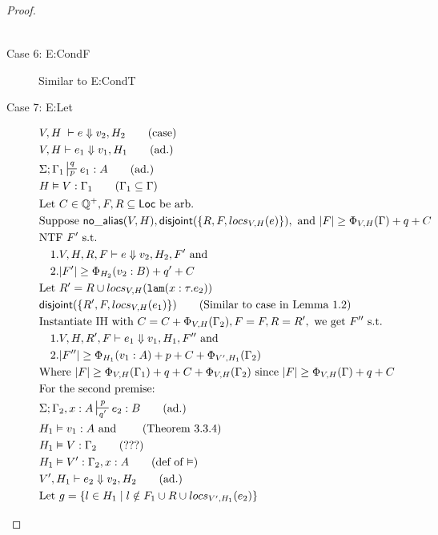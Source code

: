 \documentclass[11pt]{article}
\newcommand{\ms}[1]{\ensuremath{\mathsf{#1}}}
\newcommand{\irl}[1]{\mathtt{#1}}
\newcommand{\na}[1]{\mathsf{no\_alias}(#1)}
\newcommand{\dist}[1]{\mathsf{disjoint}(#1)}
\begin{document}
\begin{proof}
\begin{description}
\begin{align*}
  \end{align*}
  \item[Case 6: E:CondF] 
  Similar to E:CondT
  \item[Case 7: E:Let]
  \begin{align*}
  &V,H \; \vdash e \Downarrow v_2,H_2 \tag{case}\\
  &V,H \vdash e_1 \Downarrow v_1,H_1 \tag{ad.}\\
  &\Sigma; \Gamma_1 \sststile{p}{q} e_1 : A \tag{ad.}\\
  &H \vDash V : \Gamma_1 \tag{$\Gamma_1 \subseteq \Gamma$}\\
  &\text{Let } C \in \mathbb{Q}^+, F,R \subseteq \ms{Loc} \text{ be arb.}\\
  &\text{Suppose }  \na{V,H}, \dist{\{R,F,locs_{V,H}(e)\}}, \text{ and } |F| \ge \Phi_{V,H}(\Gamma) + q + C\\
  &\text{NTF } F' \text{ s.t. }\\
  &\quad 1. V,H,R,F \vdash e \Downarrow v_2, H_2,F' \text{ and }\\ 
  &\quad 2. |F'| \ge \Phi_{H_2}(v_2:B) + q' + C\\
  &\text{Let } R' = R \cup locs_{V,H}(\irl{lam}(x : \tau.e_2))\\
  &\dist{\{R',F,locs_{V,H}(e_1)\}} \tag{Similar to case in Lemma 1.2}\\
  &\text{Instantiate IH with } C = C + \Phi_{V,H}(\Gamma_2), F = F, R = R', \text{ we get } F'' \text{ s.t. }\\
  &\quad 1. V,H,R',F \vdash e_1 \Downarrow v_1, H_1,F'' \text{ and }\\ 
  &\quad 2. |F''| \ge \Phi_{H_1}(v_1:A) + p + C + \Phi_{V',H_1}(\Gamma_2)\\
  &\text{Where } |F| \ge \Phi_{V,H}(\Gamma_1) + q + C + \Phi_{V,H}(\Gamma_2) \text{ since }  |F| \ge \Phi_{V,H}(\Gamma) + q + C\\ 
  &\text{For the second premise: }\\
  &\Sigma; \Gamma_2, x : A \sststile{q'}{p} e_2 : B \tag{ad.}\\
  &H_1 \vDash v_1 : A \text{ and } \tag{Theorem 3.3.4}\\ 
  &H_1 \vDash V : \Gamma_2 \tag{???}\\
  &H_1 \vDash V' : \Gamma_2, x : A \tag{def of $\vDash$}\\
  &V',H_1 \vdash e_2 \Downarrow v_2,H_2 \tag{ad.}\\
  &\text{Let } g = \{l \in H_1 \mid l \notin F_1 \cup R \cup locs_{V',H_1}(e_2)\}\\ 

\end{align*}
\end{description}
\end{proof}
\end{document}
